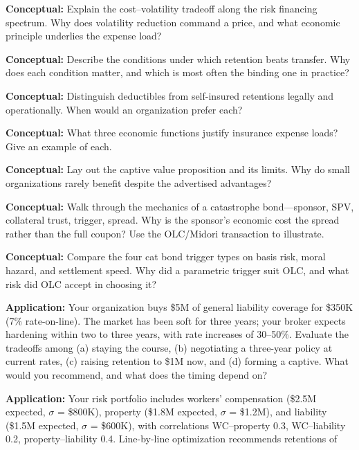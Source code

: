 \documentclass[11pt,openany]{book}
\begin{document}
\begin{discussionquestions}
\item \textbf{Conceptual:} Explain the cost--volatility tradeoff along the
  risk financing spectrum. Why does volatility reduction command a price, and
  what economic principle underlies the expense load?
\item \textbf{Conceptual:} Describe the conditions under which retention
  beats transfer. Why does each condition matter, and which is most often the
  binding one in practice?
\item \textbf{Conceptual:} Distinguish deductibles from self-insured
  retentions legally and operationally. When would an organization prefer
  each?
\item \textbf{Conceptual:} What three economic functions justify insurance
  expense loads? Give an example of each.
\item \textbf{Conceptual:} Lay out the captive value proposition and its
  limits. Why do small organizations rarely benefit despite the advertised
  advantages?
\item \textbf{Conceptual:} Walk through the mechanics of a catastrophe
  bond---sponsor, SPV, collateral trust, trigger, spread. Why is the
  sponsor's economic cost the spread rather than the full coupon? Use the
  OLC/Midori transaction to illustrate.
\item \textbf{Conceptual:} Compare the four cat bond trigger types on basis
  risk, moral hazard, and settlement speed. Why did a parametric trigger suit
  OLC, and what risk did OLC accept in choosing it?
\item \textbf{Application:} Your organization buys \$5M of general liability
  coverage for \$350K (7\% rate-on-line). The market has been soft for three
  years; your broker expects hardening within two to three years, with rate
  increases of 30--50\%. Evaluate the tradeoffs among (a) staying the course,
  (b) negotiating a three-year policy at current rates, (c) raising retention
  to \$1M now, and (d) forming a captive. What would you recommend, and what
  does the timing depend on?
\item \textbf{Application:} Your risk portfolio includes workers'
  compensation (\$2.5M expected, \(\sigma\) = \$800K), property (\$1.8M
  expected, \(\sigma\) = \$1.2M), and liability (\$1.5M expected, \(\sigma\)
  = \$600K), with correlations WC--property 0.3, WC--liability 0.2,
  property--liability 0.4. Line-by-line optimization recommends retentions of

\end{discussionquestions}
\end{document}
